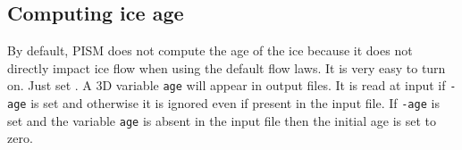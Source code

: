 \subsection{Computing ice age} \label{subsect:age}

By default, PISM does not compute the age of the ice because it does not directly impact ice flow when using the default flow laws.  It is very easy to turn on.  Just set .  A 3D variable \texttt{age} will appear in output files.  It is read at input if \texttt{-age} is set and otherwise it is ignored even if present in the input file.  If \texttt{-age} is set and the variable \texttt{age} is absent in the input file then the initial age is set to zero.



